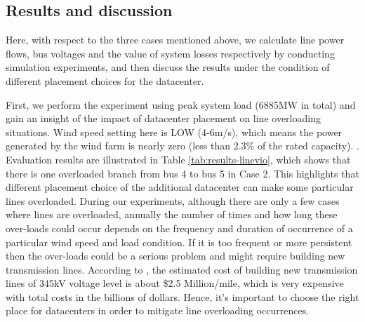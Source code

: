 \subsection{Results and discussion}

Here, with respect to the three cases mentioned above, we calculate line power flows, bus voltages and the value of system losses respectively by conducting simulation experiments, and then discuss the results under the condition of different placement choices for the datacenter.

First, we perform the experiment using peak system load (6885MW in total) and gain an insight of the impact of datacenter placement on line overloading situations. Wind speed setting here is LOW (4-6m/s), which means the power generated by the wind farm is nearly zero (less than 2.3\% of the rated capacity). . Evaluation results are illustrated in Table \ref{tab:results-linevio}, which shows that there is one overloaded branch from bus 4 to bus 5 in Case 2. This highlights that different placement choice of the additional datacenter can make some particular lines overloaded. During our experiments, although there are only a few cases where lines are overloaded, annually the number of times and how long these over-loads could occur depends on the frequency and duration of occurrence of a particular wind speed and load condition. If it is too frequent or more persistent then the over-loads could be a serious problem and might require building new transmission lines. According to \cite{interconnection2010survey}, the estimated cost of building new transmission lines of 345kV voltage level is about \$2.5 Million/mile, which is very expensive with total costs in the billions of dollars. Hence, it's important to choose the right place for datacenters in order to mitigate line overloading occurrences.


